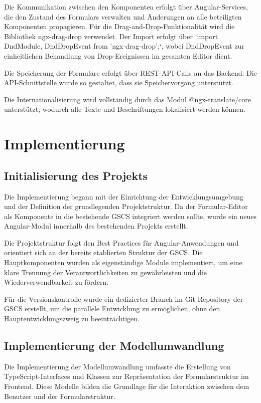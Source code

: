 \documentclass[a4paper,11pt]{article}
\begin{document}
\noindent Die Kommunikation zwischen den Komponenten erfolgt über Angular-Services, die den Zustand des Formulars verwalten und Änderungen an alle beteiligten Komponenten propagieren. Für die Drag-and-Drop-Funktionalität wird die Bibliothek ngx-drag-drop verwendet. Der Import erfolgt über `import { DndModule, DndDropEvent } from 'ngx-drag-drop';`, wobei DndDropEvent zur einheitlichen Behandlung von Drop-Ereignissen im gesamten Editor dient.

\noindent Die Speicherung der Formulare erfolgt über REST-API-Calls an das Backend. Die API-Schnittstelle wurde so gestaltet, dass sie Speichervorgang unterstützt.

\noindent Die Internationalisierung wird vollständig durch das Modul @ngx-translate/core unterstützt, wodurch alle Texte und Beschriftungen lokalisiert werden können.
\section{Implementierung}
\subsection{Initialisierung des Projekts}
Die Implementierung begann mit der Einrichtung der Entwicklungsumgebung und der Definition der grundlegenden Projektstruktur. Da der Formular-Editor als Komponente in die bestehende GSCS integriert werden sollte, wurde ein neues Angular-Modul innerhalb des bestehenden Projekts erstellt.

\noindent Die Projektstruktur folgt den Best Practices für Angular-Anwendungen und orientiert sich an der bereits etablierten Struktur der GSCS. Die Hauptkomponenten wurden als eigenständige Module implementiert, um eine klare Trennung der Verantwortlichkeiten zu gewährleisten und die Wiederverwendbarkeit zu fördern.

\noindent Für die Versionskontrolle wurde ein dedizierter Branch im Git-Repository der GSCS erstellt, um die parallele Entwicklung zu ermöglichen, ohne den Hauptentwicklungszweig zu beeinträchtigen.

\subsection{Implementierung der Modellumwandlung}
Die Implementierung der Modellumwandlung umfasste die Erstellung von TypeScript-Interfaces und Klassen zur Repräsentation der Formularstruktur im Frontend. Diese Modelle bilden die Grundlage für die Interaktion zwischen dem Benutzer und der Formularstruktur.
\end{document}

